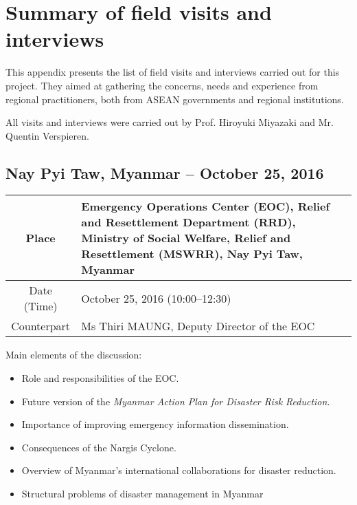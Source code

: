 \chapter{Summary of field visits and interviews}

\tab This appendix presents the list of field visits and interviews carried out for this project. They aimed at gathering the concerns, needs and experience from regional practitioners, both from ASEAN governments and regional institutions.

\vspace{0.4 cm}

All visits and interviews were carried out by Prof. Hiroyuki Miyazaki and Mr. Quentin Verspieren.

\section{Nay Pyi Taw, Myanmar -- October 25, 2016}

\begin{table}[H]
   \centering
   \begin{tabular}{| c | p{12 cm} |}
   \hline
    Place & Emergency Operations Center (EOC), Relief and Resettlement Department (RRD), Ministry of Social Welfare, Relief and Resettlement (MSWRR), Nay Pyi Taw, Myanmar \\ \hline
    Date (Time) & October 25, 2016 (10:00--12:30) \\ \hline
    Counterpart & Ms Thiri MAUNG, Deputy Director of the EOC \\ \hline   
   \end{tabular}
\end{table}

Main elements of the discussion:

\begin{itemize}

\item Role and responsibilities of the EOC.

\item Future version of the \textit{Myanmar Action Plan for Disaster Risk Reduction}.

\item Importance of improving emergency information dissemination.

\item Consequences of the Nargis Cyclone.

\item Overview of Myanmar's international collaborations for disaster reduction.

\item Structural problems of disaster management in Myanmar

\end{itemize}




